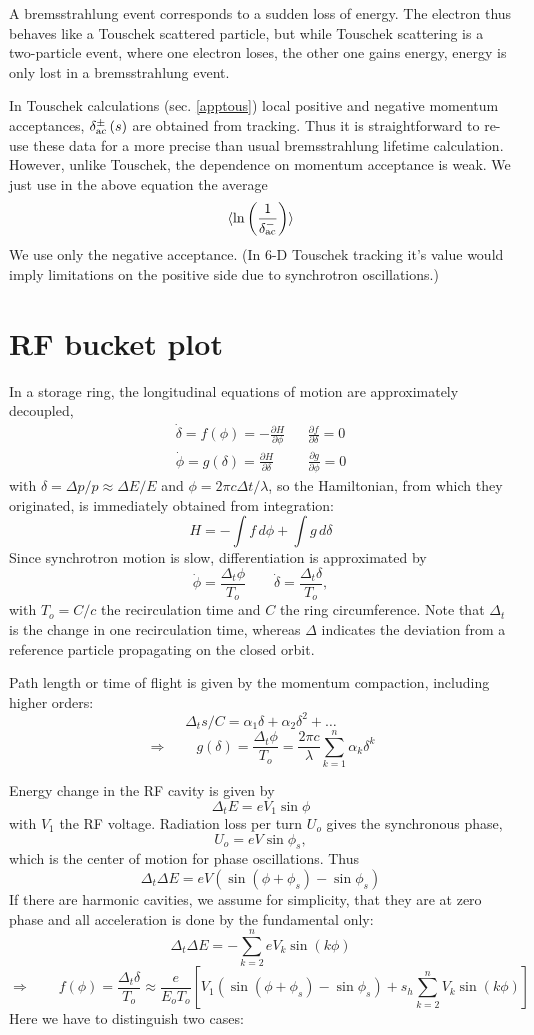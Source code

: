 \documentclass[12pt]{article}
\newcommand\beq{\begin{equation}}
\newcommand\eeq{\end{equation}}
\begin{document}
A bremsstrahlung event corresponds to a sudden loss of energy. The electron thus behaves like a Touschek scattered particle, but while Touschek scattering is a two-particle event, where one electron loses, the other one gains energy, energy is only lost in a bremsstrahlung event.

In Touschek calculations (sec. \ref{apptous}) local positive and negative momentum acceptances, $\delta_{\rm ac}^{\pm}\,(s)$ are obtained from tracking. Thus it is straightforward to re-use these data for a more precise than usual bremsstrahlung lifetime calculation. However, unlike Touschek, the dependence on momentum acceptance is weak. We just use in the  above equation the average
\beq
\langle \ln\left(\frac{1}{\delta_{\rm ac}^{-}}\right) \rangle
\eeq
We use only the negative acceptance. (In 6-D Touschek tracking it's value would imply limitations on the positive side due to synchrotron oscillations.)

\section{\label{appbucket}RF bucket plot}
In a storage ring, the longitudinal equations of motion are approximately decoupled,
\begin{eqnarray}
\dot{\delta}=f(\phi)=-\frac{\partial H}{\partial \phi} & & \frac{\partial f}{\partial \delta}=0 \\
\dot{\phi}=g(\delta)=\frac{\partial H}{\partial \delta} & & \frac{\partial g}{\partial \phi}=0
\end{eqnarray}
with $\delta=\Delta p/p\approx \Delta E/E$ and $\phi=2\pi c \Delta t/\lambda$, so the Hamiltonian, from which they originated, is immediately obtained from integration:
\beq
H = -\int f\, d\phi + \int g \, d \delta
\eeq
Since synchrotron motion is slow, differentiation is approximated by
\beq
\dot{\phi}=\frac{\Delta_t \phi}{T_o}\qquad \dot{\delta}=\frac{\Delta_t \delta}{T_o},
\eeq
with $T_o=C/c$ the recirculation time and $C$ the ring circumference. Note that $\Delta_t$ is the change in one recirculation time, whereas $\Delta$ indicates the deviation from a reference particle propagating on the closed orbit.

Path length or time of flight is given by the momentum compaction, including higher orders:
\beq
\Delta_t s/C = \alpha_1 \delta + \alpha_2 \delta^2+ \dots
\eeq
\beq
\Longrightarrow\qquad g(\delta)=\frac{\Delta_t \phi}{T_o} = \frac{2\pi c}{\lambda}\sum_{k=1}^{n} \alpha_k\delta^k
\eeq

Energy change in the RF cavity is given by
\beq
\Delta_t E = eV_1 \sin\phi
\eeq
with $V_1$ the RF voltage. Radiation loss per turn $U_o$ gives the synchronous phase,
\beq
U_o = eV \sin \phi_s,
\eeq
which is the center of motion for phase oscillations. Thus
\beq
\Delta_t \Delta E = eV \left( \sin(\phi+\phi_s)-\sin\phi_s \right)
\eeq
If there are harmonic cavities, we assume for simplicity, that they are at zero phase and all acceleration is done by the fundamental only:
\beq
\Delta_t \Delta E = - \sum_{k=2}^n eV_k \sin (k\phi)
\eeq
\beq
\Longrightarrow\qquad f(\phi)=\frac{\Delta_t \delta}{T_o} \approx \frac{e}{E_oT_o}\left[ V_1 \left( \sin(\phi+\phi_s)-\sin\phi_s \right)+s_h\sum_{k=2}^n V_k\sin(k \phi)\right]
\eeq
Here we have to distinguish two cases:
\end{document}
